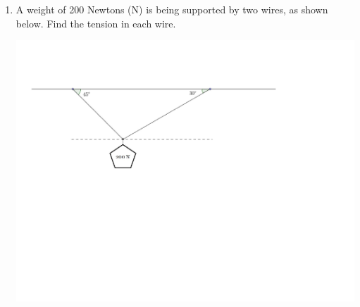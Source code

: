 \documentclass[12pt]{article}
\newif\ifans
\begin{document}
\begin{enumerate}
\newpage

\item A weight of 200 Newtons (N) is being supported by two wires, as shown below.  Find the tension in each wire.
\begin{center}
\includegraphics[scale=0.6]{vector6.pdf}
\end{center}

\ifans{\fbox{\parbox{1\linewidth}{Let $F_1$ be the wire which  makes an angle of $45^{\circ}$ clockwise with the ceiling and $F_2$ be the wire which  makes an angle of $30^{\circ}$ counterclockwise with the ceiling.  Then $\|F_2\|=\frac{400}{1+\sqrt{3}}$ N and $\|F_1\|=\frac{\sqrt{3}}{\sqrt{2}}\cdot\frac{400}{1+\sqrt{3}}$ N.}}} \fi

\end{enumerate}
\end{document}
